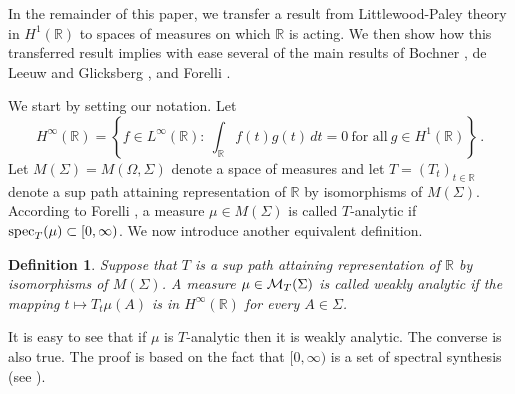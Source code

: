 \documentclass[12pt]{article}
\newcommand{\R}{\mathbb R}
\renewcommand{\O}{\Omega}
\newcommand{\spec}{{\rm spec}}
\newcommand{\cMT}{{\cal M}_T(\Sigma)}
\newtheorem{defin}{Definition}[section]
\begin{document}
In the remainder of this paper,
we transfer a result from Littlewood-Paley theory in $H^1(\R)$
to spaces of measures on which $\R$ is acting.
We then show 
how this transferred result implies 
with ease several of the main results of Bochner \cite{bs},
de Leeuw and Glicksberg \cite{deleeuwglicksberg}, and Forelli \cite{forelli}.

We start by setting our notation.  Let
$$H^\infty(\R)=\left\{f\in L^\infty(\R):\ \int_\R f(t)g(t)\, dt=0\ \mbox{for all}\ g\in H^1(\R)\right\}\, .$$ 
Let $M(\Sigma)=M(\O,\Sigma)$ denote a space of measures and  
let $T=(T_t)_{t\in\R}$ denote a sup path attaining representation of 
$\R$ by isomorphisms of $M(\Sigma)$.
  According to Forelli \cite{forelli},
a measure $\mu\in M(\Sigma)$ 
is called $T$-analytic if $\spec_T(\mu)\subset [0,\infty)$.
We now introduce another equivalent definition.
\begin{defin}
Suppose that $T$ is a sup path attaining representation of $\R$
by isomorphisms of $M(\Sigma)$.  A measure $\mu\in \cMT$ is 
called weakly analytic if the mapping $t\mapsto T_t\mu(A)$ 
is in $H^\infty(\R)$ for every $A\in\Sigma$.
\label{weakanalyticmeasure}
\end{defin}
It is easy to see that if $\mu$ is $T$-analytic then it is 
weakly analytic.  The converse is also true.  The proof is based on the 
fact that $[0,\infty)$ is a set of spectral synthesis (see \cite[Proposition 1.7]{ams2}).
\end{document}

